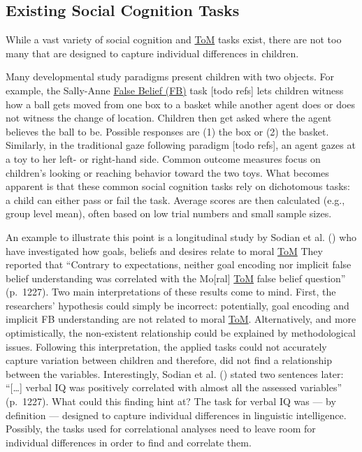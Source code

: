\documentclass[
]{scrbook}
\begin{document}
\subsection{Existing Social Cognition Tasks}\label{existing-social-cognition-tasks}

While a vast variety of social cognition and \hyperref[acronyms_ToM]{ToM} tasks exist, there are not too many that are designed to capture individual differences in children.

Many developmental study paradigms present children with two objects. For example, the Sally-Anne \hyperref[acronyms_FB]{False Belief (FB)} task {[}todo refs{]} lets children witness how a ball gets moved from one box to a basket while another agent does or does not witness the change of location. Children then get asked where the agent believes the ball to be. Possible responses are (1) the box or (2) the basket. Similarly, in the traditional gaze following paradigm {[}todo refs{]}, an agent gazes at a toy to her left- or right-hand side. Common outcome measures focus on children's looking or reaching behavior toward the two toys. What becomes apparent is that these common social cognition tasks rely on dichotomous tasks: a child can either pass or fail the task. Average scores are then calculated (e.g., group level mean), often based on low trial numbers and small sample sizes.

An example to illustrate this point is a longitudinal study by Sodian et al. () who have investigated how goals, beliefs and desires relate to moral \hyperref[acronyms_ToM]{ToM} They reported that ``Contrary to expectations, neither goal encoding nor implicit false belief understanding was correlated with the Mo{[}ral{]} \hyperref[acronyms_ToM]{ToM} false belief question'' (p.~1227). Two main interpretations of these results come to mind. First, the researchers' hypothesis could simply be incorrect: potentially, goal encoding and implicit FB understanding are not related to moral \hyperref[acronyms_ToM]{ToM}. Alternatively, and more optimistically, the non-existent relationship could be explained by methodological issues. Following this interpretation, the applied tasks could not accurately capture variation between children and therefore, did not find a relationship between the variables. Interestingly, Sodian et al. () stated two sentences later: ``{[}\ldots{]} verbal IQ was positively correlated with almost all the assessed variables'' (p.~1227). What could this finding hint at? The task for verbal IQ was --- by definition --- designed to capture individual differences in linguistic intelligence. Possibly, the tasks used for correlational analyses need to leave room for individual differences in order to find and correlate them.
\end{document}
